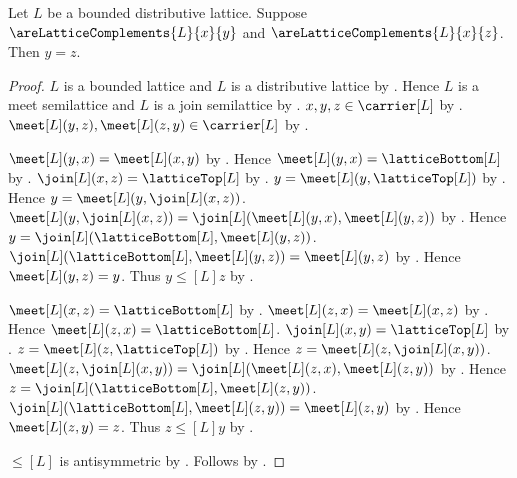\begin{theorem}\label{lattice_complement_unique}
    Let $L$ be a bounded distributive lattice.
    Suppose $\areLatticeComplements{L}{x}{y}$ and
        $\areLatticeComplements{L}{x}{z}$.
    Then $y=z$.
\end{theorem}
\begin{proof}
    $L$ is a bounded lattice and $L$ is a distributive lattice by
        .
    Hence $L$ is a meet semilattice and $L$ is a join semilattice by
        .
    $x,y,z\in\carrier[L]$ by
        .
    $\meet[L](y,z),\meet[L](z,y)\in\carrier[L]$ by .

    $\meet[L](y,x)=\meet[L](x,y)$ by .
    Hence $\meet[L](y,x)=\latticeBottom[L]$ by
        .
    $\join[L](x,z)=\latticeTop[L]$ by
        .
    $y=\meet[L](y,\latticeTop[L])$ by .
    Hence $y=\meet[L](y,\join[L](x,z))$.
    $\meet[L](y,\join[L](x,z))
        =\join[L](\meet[L](y,x),\meet[L](y,z))$ by
        .
    Hence $y=\join[L](\latticeBottom[L],\meet[L](y,z))$.
    $\join[L](\latticeBottom[L],\meet[L](y,z))=\meet[L](y,z)$ by
        .
    Hence $\meet[L](y,z)=y$.
    Thus $y\mathrel{\leq[L]}z$ by .

    $\meet[L](x,z)=\latticeBottom[L]$ by
        .
    $\meet[L](z,x)=\meet[L](x,z)$ by .
    Hence $\meet[L](z,x)=\latticeBottom[L]$.
    $\join[L](x,y)=\latticeTop[L]$ by
        .
    $z=\meet[L](z,\latticeTop[L])$ by .
    Hence $z=\meet[L](z,\join[L](x,y))$.
    $\meet[L](z,\join[L](x,y))
        =\join[L](\meet[L](z,x),\meet[L](z,y))$ by
        .
    Hence $z=\join[L](\latticeBottom[L],\meet[L](z,y))$.
    $\join[L](\latticeBottom[L],\meet[L](z,y))=\meet[L](z,y)$ by
        .
    Hence $\meet[L](z,y)=z$.
    Thus $z\mathrel{\leq[L]}y$ by .

    $\leq[L]$ is antisymmetric by
        .
    Follows by .
\end{proof}
